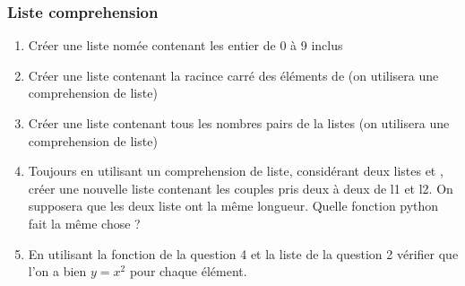 \documentclass[letterpaper,10pt,english]{sphinxhowto}
\begin{document}
\subsubsection{Liste comprehension}
\label{\detokenize{cours3_conteneur_exercices:liste-comprehension}}\begin{enumerate}
%
\item {} 
\sphinxAtStartPar
Créer une liste nomée  contenant les entier de 0 à 9 inclus

\item {} 
\sphinxAtStartPar
Créer une liste contenant la racince carré des éléments de  (on utilisera une comprehension de liste)

\item {} 
\sphinxAtStartPar
Créer une liste contenant tous les nombres pairs de la listes  (on utilisera une comprehension de liste)

\item {} 
\sphinxAtStartPar
Toujours en utilisant un comprehension de liste, considérant deux listes  et , créer une nouvelle liste contenant les couples pris deux à deux de l1 et l2. On supposera que les deux liste ont la même longueur. Quelle fonction python fait la même chose ?

\item {} 
\sphinxAtStartPar
En utilisant la fonction de la question 4 et la liste de la question 2 vérifier que l’on a bien \(y=x^2\) pour chaque élément.

\end{enumerate}
\end{document}
